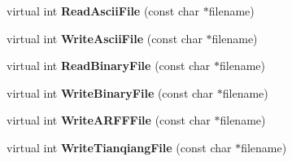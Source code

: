 \begin{DoxyCompactItemize}
\item 
virtual int {\bfseries Read\+Ascii\+File} (const char $\ast$filename)\hypertarget{class_r3_surfel_scene_a9ff325f3bb719086d6aca932deb49050}{}\label{class_r3_surfel_scene_a9ff325f3bb719086d6aca932deb49050}

\item 
virtual int {\bfseries Write\+Ascii\+File} (const char $\ast$filename)\hypertarget{class_r3_surfel_scene_a6aad289aab9336869de6d6066e326d59}{}\label{class_r3_surfel_scene_a6aad289aab9336869de6d6066e326d59}

\item 
virtual int {\bfseries Read\+Binary\+File} (const char $\ast$filename)\hypertarget{class_r3_surfel_scene_ae8ee21b1a55439d5543d189dea690252}{}\label{class_r3_surfel_scene_ae8ee21b1a55439d5543d189dea690252}

\item 
virtual int {\bfseries Write\+Binary\+File} (const char $\ast$filename)\hypertarget{class_r3_surfel_scene_a3a1489b58764a36a1445ef8171a6664e}{}\label{class_r3_surfel_scene_a3a1489b58764a36a1445ef8171a6664e}

\item 
virtual int {\bfseries Write\+A\+R\+F\+F\+File} (const char $\ast$filename)\hypertarget{class_r3_surfel_scene_a7487304e8c462560e822a247051a9bdb}{}\label{class_r3_surfel_scene_a7487304e8c462560e822a247051a9bdb}

\item 
virtual int {\bfseries Write\+Tianqiang\+File} (const char $\ast$filename)\hypertarget{class_r3_surfel_scene_a50e26f0ec234ae3794c23ce114b4b660}{}\label{class_r3_surfel_scene_a50e26f0ec234ae3794c23ce114b4b660}

\end{DoxyCompactItemize}
